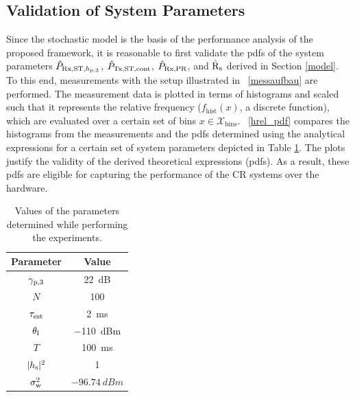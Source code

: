 \subsection{Validation of System Parameters}
\label{ssec:val_sys}
Since the stochastic model is the basis of the performance analysis of the proposed framework, it is reasonable to first validate the pdfs of the system parameters $\hat{P}_{\text{Rx,ST,$h_{\text{p,3}}$}}$, $\hat{P}_{\text{Tx,ST,cont}}$, $\hat{P}_{\text{Rx,PR}}$, and $\hat{\text{{R}}}_{\text{s}}$ derived in Section \ref{model}. To this end, measurements with the setup illustrated in \figurename~\ref{messaufbau} are performed. The measurement data is plotted in terms of histograms and scaled such that it represents the relative frequency ($f_\textrm{hist}(x)$, a discrete function), which are evaluated over a certain set of bins $x \in \mathcal X_\text{bins}$. \figurename~\ref{hrel_pdf} compares the histograms from the measurements and the pdfs determined using the analytical expressions for a certain set of system parameters depicted in Table \ref{param}. The plots justify the validity of the derived theoretical expressions (pdfs). As a result, these pdfs are eligible for capturing the performance of the CR systems over the hardware. 


\begin{table}
	\renewcommand{\arraystretch}{1.4}
	\centering
	\caption{Values of the parameters determined while performing the experiments.}
	\label{param}
	\begin{tabular}{c||c}
		\bfseries Parameter & \bfseries Value \\ \hline \hline
		${\gamma}_{\text{p,3}}$ & \SI{22}{dB} \\
		$N$ & 100 \\
		$\tau_{\text{est}}$ & \SI{2}{ms}\\
		$\theta_{\text{I}}$ & \SI{-110}{dBm}\\
		$T$ & \SI{100}{ms}\\
		$|h_{\text{s}}|^2$ & 1 \\
		$\sigma^2_{\text{w}}$ & $\SI{-96.74}{dBm}$\\ \hline
	\end{tabular}
\end{table}

